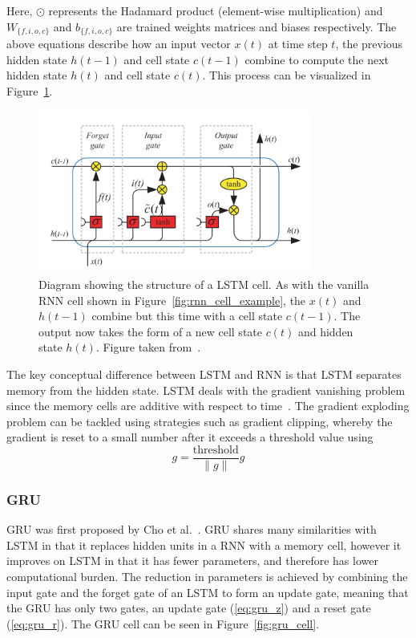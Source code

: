 Here, $\odot$ represents the Hadamard product (element-wise multiplication) and
$W_{\{f,i,o,c\}}$ and $b_{\{f,i,o,c\}}$ are trained weights matrices and biases
respectively. The above equations describe how an input vector $x(t)$ at time
step $t$, the previous hidden state $h(t-1)$ and cell state $c(t-1)$ combine to
compute the next hidden state $h(t)$ and cell state $c(t)$. This process can be
visualized in Figure~\ref{fig:lstm_cell_example}.

\begin{figure}[ht]
  \centering
  \includegraphics[width=0.8\textwidth]{figures/lstm_cell.png}
  \caption{Diagram showing the structure of a LSTM cell. As with the vanilla RNN
    cell shown in Figure~\ref{fig:rnn_cell_example}, the $x(t)$ and $h(t-1)$
    combine but this time with a cell state $c(t-1)$. The output now takes the
    form of a new cell state $c(t)$ and hidden state $h(t)$. Figure taken
  from~\cite{yu2019review}.}\label{fig:lstm_cell_example}
\end{figure}

The key conceptual difference between LSTM and RNN is that LSTM separates memory
from the hidden state. LSTM deals with the gradient vanishing problem since the
memory cells are additive with respect to time~\cite{daniluk2004automatic}. The
gradient exploding problem can be tackled using strategies such as gradient
clipping, whereby the gradient is reset to a small number after it exceeds a
threshold value using \begin{equation} g = \frac{\text{threshold}}{\|g\|}g
\end{equation}

\subsubsection{GRU}

GRU was first proposed by Cho et al.~\cite{cho2014properties}. GRU shares many
similarities with LSTM in that it replaces hidden units in a RNN with a memory
cell, however it improves on LSTM in that it has fewer parameters, and therefore
has lower computational burden. The reduction in parameters is achieved by
combining the input gate and the forget gate of an LSTM to form an update gate,
meaning that the GRU has only two gates, an update gate (\ref{eq:gru_z}) and a
reset gate (\ref{eq:gru_r}). The GRU cell can be seen in
Figure~\ref{fig:gru_cell}.

